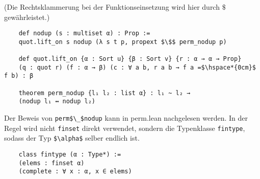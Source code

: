 \documentclass[a4paper,12pt]{scrartcl}
\newcommand{\ls}[1]{\lstinline|#1|}
\begin{document}
	(Die Rechtsklammerung bei der Funktionseinsetzung wird hier durch $\$$ gewährleistet.)
	\begin{lstlisting}
	def nodup (s : multiset α) : Prop :=
	quot.lift_on s nodup (λ s t p, propext $\$$ perm_nodup p)
	
	def quot.lift_on {α : Sort u} {β : Sort v} {r : α → α → Prop} 
	(q : quot r) (f : α → β) (c : ∀ a b, r a b → f a =$\hspace*{0cm}$ f b) : β 
	
	theorem perm_nodup {l₁ l₂ : list α} : l₁ ~ l₂ → 
	(nodup l₁ ↔ nodup l₂)
	\end{lstlisting}
	Der Beweis von \lstinline|perm$\_$nodup| kann in perm.lean nachgelesen werden.
	In der Regel wird nicht \ls{finset} direkt verwendet, sondern die Typenklasse \ls{fintype}, sodass der Typ \ls{$\alpha$} selber endlich ist.
	\begin{lstlisting}
	class fintype (α : Type*) :=
	(elems : finset α)
	(complete : ∀ x : α, x ∈ elems)
	\end{lstlisting}
	
	
\end{document}
